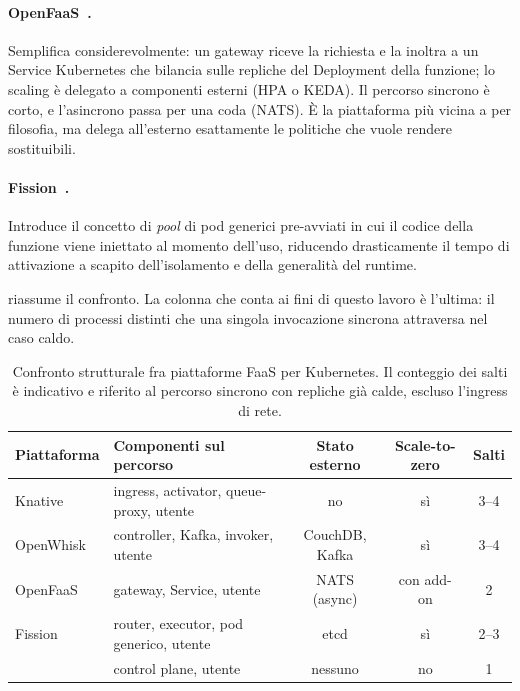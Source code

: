 \paragraph{OpenFaaS~\cite{openfaas}.} Semplifica considerevolmente: un gateway
riceve la richiesta e la inoltra a un Service Kubernetes che bilancia sulle
repliche del Deployment della funzione; lo scaling \`e delegato a componenti
esterni (HPA o KEDA). Il percorso sincrono \`e corto, e l'asincrono passa per
una coda (NATS). \`E la piattaforma pi\`u vicina a \nf{} per filosofia, ma
delega all'esterno esattamente le politiche che \nf{} vuole rendere
sostituibili.

\paragraph{Fission~\cite{fission}.} Introduce il concetto di \emph{pool} di pod
generici pre-avviati in cui il codice della funzione viene iniettato al momento
dell'uso, riducendo drasticamente il tempo di attivazione a scapito
dell'isolamento e della generalit\`a del runtime.

 riassume il confronto. La colonna che conta ai fini di
questo lavoro \`e l'ultima: il numero di processi distinti che una singola
invocazione sincrona attraversa nel caso caldo.

\begin{table}[htbp]
\centering
\caption{Confronto strutturale fra piattaforme FaaS per Kubernetes.
Il conteggio dei salti \`e indicativo e riferito al percorso sincrono con
repliche gi\`a calde, escluso l'ingress di rete.}
\label{tab:piattaforme}
\small
\begin{tabularx}{\textwidth}{@{}lXccc@{}}
\toprule
\textbf{Piattaforma} & \textbf{Componenti sul percorso} & \textbf{Stato esterno} &
\textbf{Scale-to-zero} & \textbf{Salti} \\
\midrule
Knative     & ingress, activator, queue-proxy, utente & no & s\`i & 3--4 \\
OpenWhisk   & controller, Kafka, invoker, utente      & CouchDB, Kafka & s\`i & 3--4 \\
OpenFaaS    & gateway, Service, utente                & NATS (async) & con add-on & 2 \\
Fission     & router, executor, pod generico, utente  & etcd & s\`i & 2--3 \\
\nf{}       & control plane, utente                   & nessuno & no & 1 \\
\bottomrule
\end{tabularx}
\end{table}

